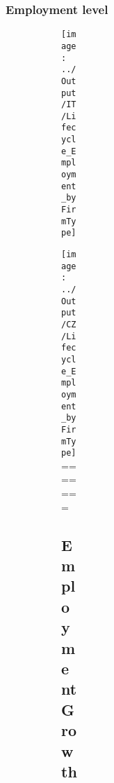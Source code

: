 \documentclass[12pt,notitlepage]{article}
\begin{document}
\begin{figure}[!htpb]
\begin{subfigure}{.49\textwidth}
\begin{figure}[!htpb]
\begin{subfigure}{.49\textwidth}
\subsubsection{Employment level}
\begin{figure}[!htpb]
\centering
\caption{Employment level (Average)}
\begin{subfigure}{.49\textwidth}
    \centering
 \texttt{[image: ../Output/IT/Lifecycle\_Employment\_byFirmType]}
\end{subfigure}%
\begin{subfigure}{.49\textwidth}
    \centering
 \texttt{[image: ../Output/CZ/Lifecycle\_Employment\_byFirmType]}
=======



\subsection{Employment Growth} %
\label{sec:employment_growth}


\end{subfigure}
\end{figure}
\end{subfigure}
\end{figure}
\end{subfigure}
\end{figure}
\end{document}
